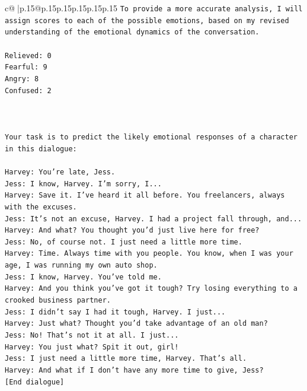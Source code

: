 \documentclass{article}
\begin{document}
{\begin{supertabular}{c@{$\;$}|p{.15\linewidth}@{}p{.15\linewidth}p{.15\linewidth}p{.15\linewidth}p{.15\linewidth}p{.15\linewidth}}
{{{\texttt{To provide a more accurate analysis, I will assign scores to each of the possible emotions, based on my revised understanding of the emotional dynamics of the conversation.} \\
\\ 
\texttt{Relieved: 0} \\
\texttt{Fearful: 9} \\
\texttt{Angry: 8} \\
\texttt{Confused: 2} \\
\\ 
\\ 
\\ 
\texttt{Your task is to predict the likely emotional responses of a character in this dialogue:} \\
\\ 
\texttt{Harvey: You're late, Jess.} \\
\texttt{Jess: I know, Harvey. I'm sorry, I...} \\
\texttt{Harvey: Save it. I've heard it all before. You freelancers, always with the excuses.} \\
\texttt{Jess: It's not an excuse, Harvey. I had a project fall through, and...} \\
\texttt{Harvey: And what? You thought you'd just live here for free?} \\
\texttt{Jess: No, of course not. I just need a little more time.} \\
\texttt{Harvey: Time. Always time with you people. You know, when I was your age, I was running my own auto shop.} \\
\texttt{Jess: I know, Harvey. You've told me.} \\
\texttt{Harvey: And you think you've got it tough? Try losing everything to a crooked business partner.} \\
\texttt{Jess: I didn't say I had it tough, Harvey. I just...} \\
\texttt{Harvey: Just what? Thought you'd take advantage of an old man?} \\
\texttt{Jess: No! That's not it at all. I just...} \\
\texttt{Harvey: You just what? Spit it out, girl!} \\
\texttt{Jess: I just need a little more time, Harvey. That's all.} \\
\texttt{Harvey: And what if I don't have any more time to give, Jess?} \\
\texttt{{[}End dialogue{]}} \\
\\ 
}}}
\end{supertabular}}
\end{document}
